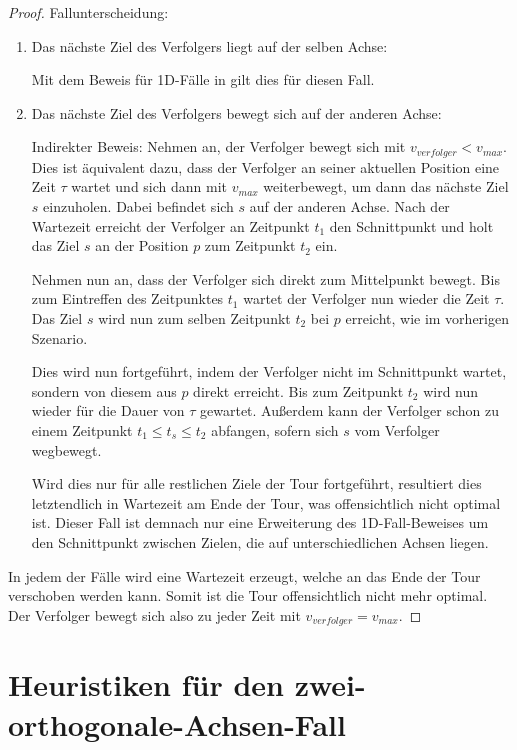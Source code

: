 \documentclass[german,version-2019-11]{uzl-thesis}
\begin{document}
\begin{proof}
Fallunterscheidung:
\begin{enumerate}
\item Das nächste Ziel des Verfolgers liegt auf der selben Achse:

Mit dem Beweis für 1D-Fälle in \cite{helvig} gilt dies für diesen Fall.

\item Das nächste Ziel des Verfolgers bewegt sich auf der anderen Achse:

Indirekter Beweis: Nehmen an, der Verfolger bewegt sich mit $v_{verfolger} < v_{max}$. Dies ist äquivalent dazu, dass der Verfolger an seiner aktuellen Position eine Zeit $\tau$ wartet und sich dann mit $v_{max}$ weiterbewegt, um dann das nächste Ziel $s$ einzuholen. Dabei befindet sich $s$ auf der anderen Achse. Nach der Wartezeit erreicht der Verfolger an Zeitpunkt $t_1$ den Schnittpunkt und holt das Ziel $s$ an der Position $p$ zum Zeitpunkt $t_2$ ein. 

Nehmen nun an, dass der Verfolger sich direkt zum Mittelpunkt bewegt. Bis zum Eintreffen des Zeitpunktes $t_1$ wartet der Verfolger nun wieder die Zeit $\tau$. Das Ziel $s$ wird nun zum selben Zeitpunkt $t_2$ bei $p$ erreicht, wie im vorherigen Szenario. 

Dies wird nun fortgeführt, indem der Verfolger nicht im Schnittpunkt wartet, sondern von diesem aus $p$ direkt erreicht. Bis zum Zeitpunkt $t_2$ wird nun wieder für die Dauer von $\tau$ gewartet. Außerdem kann der Verfolger schon zu einem Zeitpunkt $t_1 \leq t_{s} \leq t_2$ abfangen, sofern sich $s$ vom Verfolger wegbewegt. 

Wird dies nur für alle restlichen Ziele der Tour fortgeführt, resultiert dies letztendlich in Wartezeit am Ende der Tour, was offensichtlich nicht optimal ist. Dieser Fall ist demnach nur eine Erweiterung des 1D-Fall-Beweises um den Schnittpunkt zwischen Zielen, die auf unterschiedlichen Achsen liegen. 
\end{enumerate}

In jedem der Fälle wird eine Wartezeit erzeugt, welche an das Ende der Tour verschoben werden kann. Somit ist die Tour offensichtlich nicht mehr optimal. Der Verfolger bewegt sich also zu jeder Zeit mit $v_{verfolger} = v_{max}$.

\end{proof}



\chapter{Heuristiken für den zwei-orthogonale-Achsen-Fall}
\end{document}
